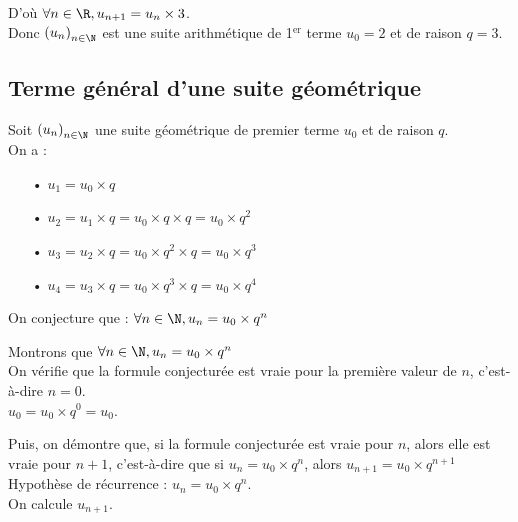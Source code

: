 \vspace*{.3cm}

D'où $\forall n \in \R, u_{n+1} = u_n \times 3$. \\

Donc $\left(u_n\right)_{n \in \N}$ est une suite arithmétique de 1$^{\mathrm{er}}$ terme $u_0 = 2$ et de raison $q = 3$. 

\subsection{Terme général d'une suite géométrique}

Soit $\left(u_n\right)_{n \in \N}$ une suite géométrique de premier terme $u_0$ et de raison $q$. \\

On a :

\begin{itemize}
\item[•] $u_1 = u_0 \times q$
\item[•] $u_2 = u_1 \times q = u_0 \times q \times q = u_0 \times q^2$
\item[•] $u_3 = u_2 \times q = u_0 \times q^2 \times q = u_0 \times q^3$
\item[•] $u_4 = u_3 \times q = u_0 \times q^3 \times q = u_0 \times q^4$
\end{itemize}

\vspace*{.3cm}

On conjecture que : $\forall n \in \N, u_n = u_0 \times q^n$ \\

\newpage

Montrons que $\forall n \in \N, u_n = u_0 \times q^n$ \\

On vérifie que la formule conjecturée est vraie pour la première valeur de $n$, c'est-à-dire $n = 0$. \\

$u_0 = u_0 \times q^0 = u_0$. 

Puis, on démontre que, si la formule conjecturée est vraie pour $n$, alors elle est vraie pour $n+1$, c'est-à-dire que si $u_n = u_0 \times q^n$, alors $u_{n+1} = u_0 \times q^{n+1}$ \\

Hypothèse de récurrence : $u_n = u_0 \times q^n$. \\

On calcule $u_{n+1}$. \\

